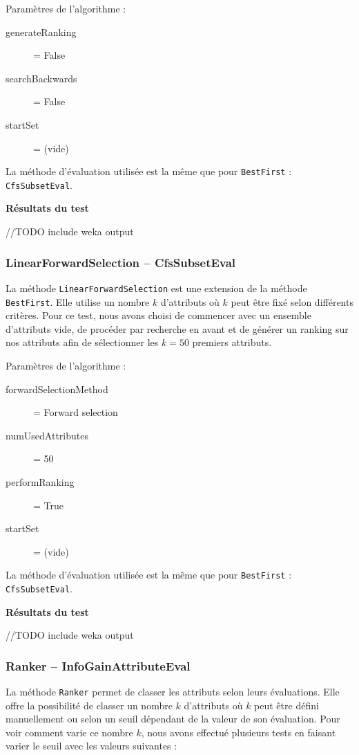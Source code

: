 Paramètres de l'algorithme :
\begin{description}
	\item[generateRanking] = False
	\item[searchBackwards] = False
	\item[startSet] = (vide)
\end{description}

La méthode d'évaluation utilisée est la même que pour \texttt{BestFirst} : \texttt{CfsSubsetEval}.

\textbf{Résultats du test}

//TODO include weka output


\subsubsection{LinearForwardSelection -- CfsSubsetEval}

La méthode \texttt{LinearForwardSelection} est une extension de la méthode \texttt{BestFirst}. Elle utilise un nombre $k$ d'attributs où $k$ peut être fixé selon différents critères. Pour ce test, nous avons choisi de commencer avec un ensemble d'attributs vide, de procéder par recherche en avant et de générer un \og ranking \fg{} sur nos attributs afin de sélectionner les $k=50$ premiers attributs.

Paramètres de l'algorithme :
\begin{description}
	\item[forwardSelectionMethod] = Forward selection
	\item[numUsedAttributes] = 50
	\item[performRanking] = True
	\item[startSet] = (vide)	
\end{description}

La méthode d'évaluation utilisée est la même que pour \texttt{BestFirst} : \texttt{CfsSubsetEval}.

\textbf{Résultats du test}

//TODO include weka output


\subsubsection{Ranker -- InfoGainAttributeEval}

La méthode \texttt{Ranker} permet de classer les attributs selon leurs évaluations. Elle offre la possibilité de classer un nombre $k$ d'attributs où $k$ peut être défini manuellement ou selon un seuil dépendant de la valeur de son évaluation. Pour voir comment varie ce nombre $k$, nous avons effectué plusieurs tests en faisant varier le seuil avec les valeurs suivantes : 

